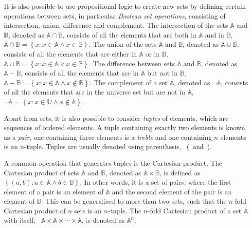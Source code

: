 It is also possible to use propositional logic to create new sets by defining certain operations between sets, in particular \emph{Boolean set operations}, consisting of intersection, union, difference and complement.
The intersection of the sets \(\mathbb{A}\) and \(\mathbb{B}\), denoted as \(\mathbb{A} \cap \mathbb{B}\), consists of all the elements that are both in \(\mathbb{A}\) and in \(\mathbb{B}\), \ie\ \(\mathbb{A} \cap \mathbb{B} = \left\{ x : x \in \mathbb{A} \wedge x \in \mathbb{B} \right\}\).
The union of the sets \(\mathbb{A}\) and \(\mathbb{B}\), denoted as \(\mathbb{A} \cup \mathbb{B}\), consists of all the elements that are either in \(\mathbb{A}\) or in \(\mathbb{B}\), \ie\ \(\mathbb{A} \cup \mathbb{B} = \left\{ x : x \in \mathbb{A} \vee x \in \mathbb{B} \right\}\).
The difference between sets \(\mathbb{A}\) and \(\mathbb{B}\), denoted as \(\mathbb{A} - \mathbb{B}\), consists of all the elements that are in \(\mathbb{A}\) but not in \(\mathbb{B}\), \ie\ \(\mathbb{A} - \mathbb{B} = \left\{ x : x \in \mathbb{A} \wedge x \notin \mathbb{B} \right\}\).
The complement of a set \(\mathbb{A}\), denoted as \(\neg \mathbb{A}\), consists of all the elements that are in the universe set but are not in \(\mathbb{A}\), \ie\ \(\neg \mathbb{A} = \left\{ x : x \in \mathbb{U} \wedge x \notin \mathbb{A} \right\}\).

Apart from sets, it is also possible to consider \emph{tuples} of elements, which are sequences of ordered elements.
A tuple containing exactly two elements is known as a \emph{pair}, one containing three elements is a \emph{treble} and one containing \(n\) elements is an \(n\)-tuple.
Tuples are usually denoted using parenthesis, \ie\ (\ and~).

A common operation that generates tuples is the Cartesian product.
The Cartesian product of sets \(\mathbb{A}\) and \(\mathbb{B}\), denoted as \(\mathbb{A} \times \mathbb{B}\), is defined as \(\left\{ (a,b) : a \in \mathbb{A} \wedge b \in \mathbb{B} \right\}\).
In other words, it is a set of pairs, where the first element of a pair is an element of \(\mathbb{A}\) and the second element of the pair is an element of \(\mathbb{B}\).
This can be generalised to more than two sets, such that the \(n\)-fold Cartesian product of \(n\) sets is an \(n\)-tuple.
The \(n\)-fold Cartesian product of a set \(\mathbb{A}\) with itself, \ie\ \(\mathbb{A} \times \mathbb{A} \times \cdots \times \mathbb{A}\), is denoted as \(\mathbb{A}^n\).

